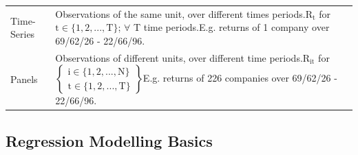 \documentclass[11pt, english]{article}
\begin{document}
\begin{center}
\begin{longtable}{p{3cm}p{9cm}}
                Time-Series & Observations of the same unit, over different times periods.\newline $\mathrm{R_t}$ for $\mathrm{t\in\{1,2, ...,T\}}$; $\forall$ T time periods.\newline E.g. returns of 1 company over 69/62/26 - 22/66/96.\\
                Panels & Observations of different units, over different time periods.\newline $\mathrm{R_{it}}$ for $\mathrm{\begin{Bmatrix}i\in\{1,2,...,N\}\\t\in\{1,2, ...,T\}\end{Bmatrix}}$\newline E.g. returns of 226 companies over 69/62/26 - 22/66/96.\\
                \hline
        \end{longtable}
        \end{center}

	\newpage

	\subsection{Regression Modelling Basics}
\end{document}
